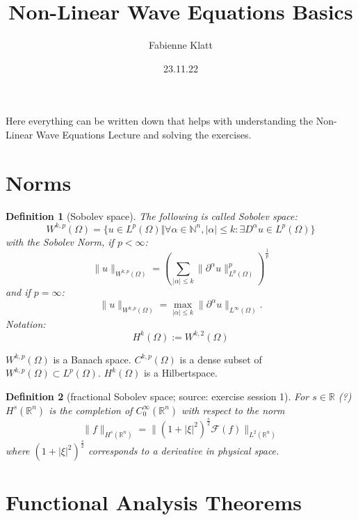 \documentclass[12pt,a4paper]{article}
\title{Non-Linear Wave Equations Basics}
\author{Fabienne Klatt}
\date{23.11.22}
\newtheorem{definition}{Definition}
\begin{document}
\tableofcontents
\thispagestyle{empty}

\clearpage

Here everything can be written down that helps with understanding the Non-Linear Wave Equations Lecture and solving the exercises.

\section{Norms}

\begin{definition}[Sobolev space]
The following is called Sobolev space:
\begin{equation}
W^{k,p}(\Omega)=\{u\in L^p(\Omega)\Vert \forall\alpha\in\mathbb{N}^n, \vert\alpha\vert\leq k:\exists D^{\alpha}u\in L^p(\Omega)\}
\end{equation}
with the Sobolev Norm, if $p<\infty$:
\begin{equation}
\lVert u\rVert_{W^{k,p}(\Omega)}=(\sum_{\vert\alpha\vert\leq k} \lVert \partial^{\alpha}u\rVert^p_{L^p(\Omega)})^{\frac{1}{p}}
\end{equation}
and if $p=\infty$:
\begin{equation}
\lVert u\rVert_{W^{k,p}(\Omega)}= \max_{\vert\alpha\vert\leq k} \lVert \partial^{\alpha}u\rVert_{L^{\infty}(\Omega)}.
\end{equation}
Notation: 
\begin{equation}
H^k(\Omega):=W^{k,2}(\Omega)
\end{equation}
\end{definition}

$W^{k,p}(\Omega)$ is a Banach space.
$C^{k,p}(\Omega)$ is a dense subset of $W^{k,p}(\Omega)\subset L^p(\Omega)$. $H^k(\Omega)$ is a Hilbertspace.

\begin{definition}[fractional Sobolev space; source: exercise session 1]
For $s\in\mathbb{R}$ (?) $H^s(\mathbb{R}^n)$ is the completion of $C^{\infty}_0(\mathbb{R}^n)$ with respect to the norm
\begin{equation}
\lVert f \rVert_{H^s(\mathbb{R}^n)}=\lVert (1+\lvert\xi\rvert^2)^{\frac{s}{2}}\mathcal{F}(f)\rVert_{L^2(\mathbb{R}^n)}
\end{equation}
where $(1+\lvert\xi\rvert^2)^{\frac{s}{2}}$ corresponds to a derivative in physical space.
\end{definition}

\section{Functional Analysis Theorems}
\end{document}
